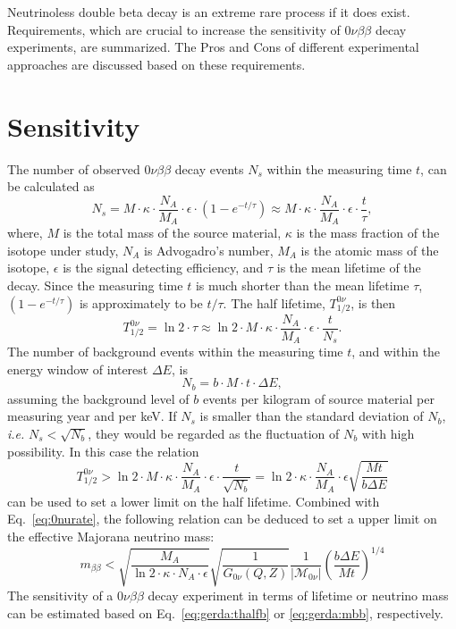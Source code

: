 Neutrinoless double beta decay is an extreme rare process if it does exist. Requirements, which are crucial to increase the sensitivity of $0\nu\beta\beta$ decay experiments, are summarized. The Pros and Cons of different experimental approaches are discussed based on these requirements.

\section{Sensitivity}
\label{sec:sensi}
The number of observed $0\nu\beta\beta$ decay events $N_{s}$ within the measuring time $t$, can be calculated as
\begin{equation}
  \label{eq:gerda:ns}
  N_{s} = M \cdot \kappa \cdot \frac{N_{A}}{M_{A}} \cdot \epsilon \cdot (1 - e^{-t/\tau}) \approx M \cdot \kappa \cdot \frac{N_{A}}{M_{A}} \cdot \epsilon \cdot \frac{t}{\tau},
\end{equation}
where, $M$ is the total mass of the source material, $\kappa$ is the mass fraction of the isotope under study, $N_{A}$ is Advogadro's number, $M_{A}$ is the atomic mass of the isotope, $\epsilon$ is the signal detecting efficiency, and $\tau$ is the mean lifetime of the decay. Since the measuring time $t$ is much shorter than the mean lifetime $\tau$, $(1 - e^{-t/\tau})$ is approximately to be $t/\tau$. The half lifetime, $T^{0\nu}_{1/2}$, is then
\begin{equation}
  \label{eq:gerda:thalf}
  T^{0\nu}_{1/2} = \ln2 \cdot \tau \approx \ln2 \cdot M \cdot \kappa \cdot \frac{N_{A}}{M_{A}} \cdot \epsilon \cdot \frac{t}{N_{s}}.
\end{equation}
The number of background events within the measuring time $t$, and within the energy window of interest $\Delta E$, is 
\begin{equation}
  \label{eq:gerda:nb}
  N_{b} = b \cdot M \cdot t \cdot \Delta E,
\end{equation}
assuming the background level of $b$ events per kilogram of source material per measuring year and per keV. If $N_{s}$ is smaller than the standard deviation of $N_{b}$, \textit{i.e.} $N_{s}<\sqrt{N_{b}}$, they would be regarded as the fluctuation of $N_{b}$ with high possibility. In this case the relation
\begin{equation}
  \label{eq:gerda:thalfb}
  T^{0\nu}_{1/2} > \ln2 \cdot M \cdot \kappa \cdot \frac{N_{A}}{M_{A}} \cdot \epsilon \cdot \frac{t}{\sqrt{N_{b}}} = \ln2 \cdot \kappa \cdot \frac{N_{A}}{M_{A}} \cdot \epsilon \sqrt{\frac{M t}{b \Delta E}}
\end{equation}
can be used to set a lower limit on the half lifetime. Combined with Eq.~\ref{eq:0nurate}, the following relation can be deduced to set a upper limit on the effective Majorana neutrino mass:
\begin{equation}
  \label{eq:gerda:mbb}
  m_{\beta\beta} < \sqrt{\frac{M_{A}}{\ln2 \cdot \kappa \cdot N_{A} \cdot \epsilon}} \sqrt{\frac{1}{G_{0\nu}(Q,Z)}} \frac{1}{|\mathcal{M}_{0\nu}|} (\frac{b \Delta E}{M t})^{1/4}
\end{equation}
The sensitivity of a
$0\nu\beta\beta$ decay experiment in terms of lifetime or neutrino mass can be estimated based on Eq.~\ref{eq:gerda:thalfb} or \ref{eq:gerda:mbb}, respectively.

